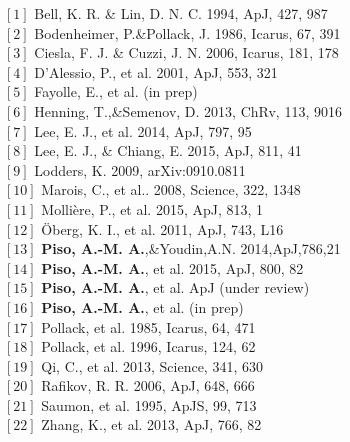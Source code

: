 \documentclass[12pt, letterpaper]{article}
\begin{document}
\begin{multicols}{2}
\noindent 
$[1]$ Bell, K. R. \& Lin, D. N. C. 1994, ApJ, 427, 987 \\
$[2]$ Bodenheimer, P.\&Pollack, J. 1986, Icarus, 67, 391 \\
$[3]$ Ciesla, F. J. \& Cuzzi, J. N. 2006, Icarus, 181, 178 \\
$[4]$ D'Alessio, P., et al. 2001, ApJ, 553, 321 \\
$[5]$ Fayolle, E., et al. (in prep) \\
$[6]$ Henning, T.,\&Semenov, D. 2013, ChRv, 113, 9016 \\
$[7]$ Lee, E. J., et al. 2014, ApJ, 797, 95 \\ 
$[8]$ Lee, E. J., \& Chiang, E. 2015, ApJ, 811, 41 \\
$[9]$ Lodders, K. 2009, arXiv:0910.0811 \\
$[10]$ Marois, C.,  et al.. 2008, Science, 322, 1348 \\
$[11]$ Molli{\`e}re, P., et al. 2015, ApJ, 813, 1 \\
$[12]$ \"Oberg, K. I., et al. 2011, ApJ, 743, L16 \\
$[13]$ \textbf{Piso, A.-M. A.},\&Youdin,A.N. 2014,ApJ,786,21 \\
$[14]$ \textbf{Piso, A.-M. A.}, et al. 2015, ApJ, 800, 82 \\
$[15]$ \textbf{Piso, A.-M. A.}, et al. ApJ (under review) \\
$[16]$ \textbf{Piso, A.-M. A.}, et al. (in prep) \\
$[17]$ Pollack, et al. 1985, Icarus, 64, 471 \\
$[18]$ Pollack, et al. 1996, Icarus, 124, 62 \\
$[19]$ Qi, C., et al. 2013, Science, 341, 630 \\
$[20]$ Rafikov, R. R. 2006, ApJ, 648, 666 \\
$[21]$ Saumon, et al. 1995, ApJS, 99, 713 \\
$[22]$ Zhang, K., et al. 2013, ApJ, 766, 82
\end{multicols}

%
%


\end{document}
